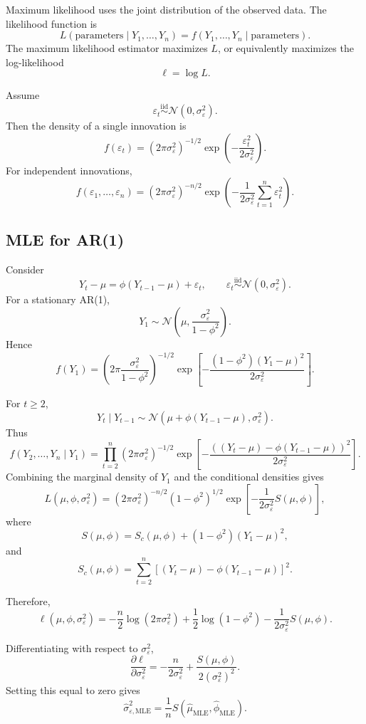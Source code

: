 \documentclass[12pt,oneside]{book}
\numberwithin{equation}{section}
\theoremstyle{definition}
\theoremstyle{plain}
\theoremstyle{remark}
\newcommand{\iid}{\overset{\text{iid}}{\sim}}
\newcommand{\Normal}{\mathcal{N}}
\begin{document}
Maximum likelihood uses the joint distribution of the observed data. The likelihood function is
\[
L(\text{parameters}\mid Y_1,\ldots,Y_n)
=
f(Y_1,\ldots,Y_n\mid \text{parameters}).
\]
The maximum likelihood estimator maximizes $L$, or equivalently maximizes the log-likelihood
\[
\ell=\log L.
\]

Assume
\[
\varepsilon_t\iid \Normal(0,\sigma_\varepsilon^2).
\]
Then the density of a single innovation is
\[
f(\varepsilon_t)
=
(2\pi\sigma_\varepsilon^2)^{-1/2}
\exp\left(
-\frac{\varepsilon_t^2}{2\sigma_\varepsilon^2}
\right).
\]
For independent innovations,
\[
f(\varepsilon_1,\ldots,\varepsilon_n)
=
(2\pi\sigma_\varepsilon^2)^{-n/2}
\exp\left(
-\frac{1}{2\sigma_\varepsilon^2}
\sum_{t=1}^n\varepsilon_t^2
\right).
\]

\subsection{MLE for AR(1)}

Consider
\[
Y_t-\mu=\phi(Y_{t-1}-\mu)+\varepsilon_t,
\qquad
\varepsilon_t\iid \Normal(0,\sigma_\varepsilon^2).
\]
For a stationary AR(1),
\[
Y_1\sim \Normal\left(\mu,\frac{\sigma_\varepsilon^2}{1-\phi^2}\right).
\]
Hence
\[
f(Y_1)
=
\left(2\pi\frac{\sigma_\varepsilon^2}{1-\phi^2}\right)^{-1/2}
\exp\left[
-\frac{(1-\phi^2)(Y_1-\mu)^2}{2\sigma_\varepsilon^2}
\right].
\]

For $t\geq 2$,
\[
Y_t\mid Y_{t-1}
\sim
\Normal\left(
\mu+\phi(Y_{t-1}-\mu),
\sigma_\varepsilon^2
\right).
\]
Thus
\[
f(Y_2,\ldots,Y_n\mid Y_1)
=
\prod_{t=2}^n
(2\pi\sigma_\varepsilon^2)^{-1/2}
\exp\left[
-\frac{
\left((Y_t-\mu)-\phi(Y_{t-1}-\mu)\right)^2
}{2\sigma_\varepsilon^2}
\right].
\]
Combining the marginal density of $Y_1$ and the conditional densities gives
\[
L(\mu,\phi,\sigma_\varepsilon^2)
=
(2\pi\sigma_\varepsilon^2)^{-n/2}
(1-\phi^2)^{1/2}
\exp\left[
-\frac{1}{2\sigma_\varepsilon^2}
S(\mu,\phi)
\right],
\]
where
\[
S(\mu,\phi)
=
S_c(\mu,\phi)
+
(1-\phi^2)(Y_1-\mu)^2,
\]
and
\[
S_c(\mu,\phi)
=
\sum_{t=2}^n
\left[
(Y_t-\mu)-\phi(Y_{t-1}-\mu)
\right]^2.
\]

Therefore,
\[
\ell(\mu,\phi,\sigma_\varepsilon^2)
=
-\frac{n}{2}\log(2\pi\sigma_\varepsilon^2)
+
\frac{1}{2}\log(1-\phi^2)
-
\frac{1}{2\sigma_\varepsilon^2}S(\mu,\phi).
\]

Differentiating with respect to $\sigma_\varepsilon^2$,
\[
\frac{\partial \ell}{\partial \sigma_\varepsilon^2}
=
-\frac{n}{2\sigma_\varepsilon^2}
+
\frac{S(\mu,\phi)}{2(\sigma_\varepsilon^2)^2}.
\]
Setting this equal to zero gives
\[
\widehat{\sigma}_{\varepsilon,\mathrm{MLE}}^2
=
\frac{1}{n}S(\widehat{\mu}_{\mathrm{MLE}},\widehat{\phi}_{\mathrm{MLE}}).
\]
\end{document}
